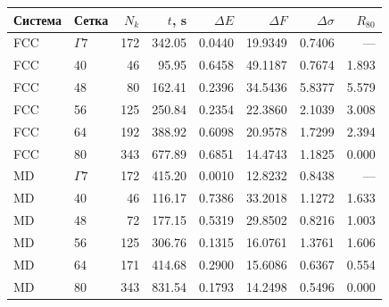 \begin{center}
\small
\begin{tabular}{llrrrrrr}
\toprule
Система & Сетка & $N_k$ & $t$, s & $\Delta E$ & $\Delta F$ & $\Delta\sigma$ & $R_{80}$\\
\midrule
FCC & $\Gamma7$ & 172 & 342.05 & 0.0440 & 19.9349 & 0.7406 & ---\\
FCC & 40 & 46 & 95.95 & 0.6458 & 49.1187 & 0.7674 & 1.893\\
FCC & 48 & 80 & 162.41 & 0.2396 & 34.5436 & 5.8377 & 5.579\\
FCC & 56 & 125 & 250.84 & 0.2354 & 22.3860 & 2.1039 & 3.008\\
FCC & 64 & 192 & 388.92 & 0.6098 & 20.9578 & 1.7299 & 2.394\\
FCC & 80 & 343 & 677.89 & 0.6851 & 14.4743 & 1.1825 & 0.000\\
\midrule
MD & $\Gamma7$ & 172 & 415.20 & 0.0010 & 12.8232 & 0.8438 & ---\\
MD & 40 & 46 & 116.17 & 0.7386 & 33.2018 & 1.1272 & 1.633\\
MD & 48 & 72 & 177.15 & 0.5319 & 29.8502 & 0.8216 & 1.003\\
MD & 56 & 125 & 306.76 & 0.1315 & 16.0761 & 1.3761 & 1.606\\
MD & 64 & 171 & 414.68 & 0.2900 & 15.6086 & 0.6367 & 0.554\\
MD & 80 & 343 & 831.54 & 0.1793 & 14.2498 & 0.5496 & 0.000\\
\bottomrule
\end{tabular}
\end{center}
